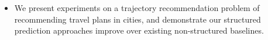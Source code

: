\begin{itemize}[noitemsep,leftmargin=12pt]

	\item We present experiments on a trajectory recommendation problem of recommending travel plans in cities, and demonstrate our structured prediction approaches improve over existing non-structured baselines. %
\end{itemize}

